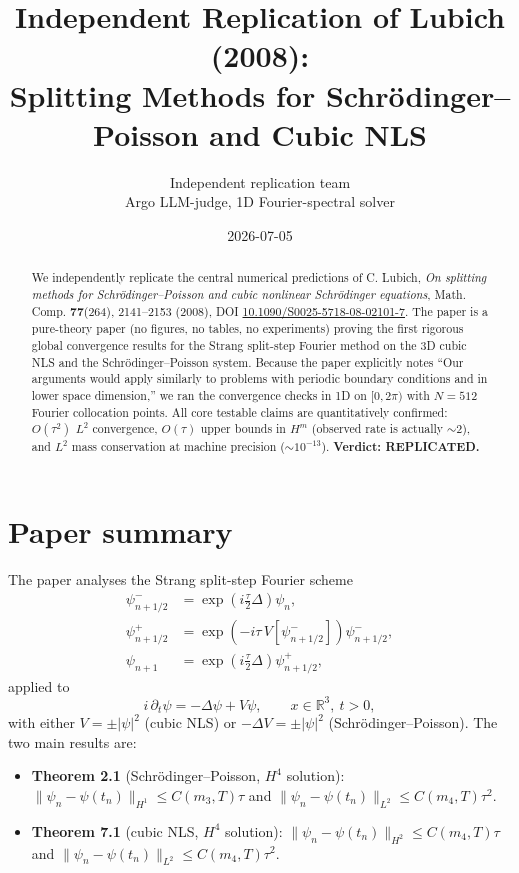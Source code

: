 \documentclass[11pt]{article}
\title{Independent Replication of Lubich (2008): \\
Splitting Methods for Schr\"odinger--Poisson and Cubic NLS}
\author{Independent replication team \\
\small Argo LLM-judge, 1D Fourier-spectral solver}
\date{2026-07-05}
\begin{document}
\maketitle

\begin{abstract}
We independently replicate the central numerical predictions of C. Lubich,
\emph{On splitting methods for Schr\"odinger--Poisson and cubic nonlinear
Schr\"odinger equations}, Math. Comp. \textbf{77}(264), 2141--2153 (2008),
DOI \href{https://doi.org/10.1090/S0025-5718-08-02101-7}{10.1090/S0025-5718-08-02101-7}.
The paper is a pure-theory paper (no figures, no tables, no experiments) proving
the first rigorous global convergence results for the Strang split-step Fourier
method on the 3D cubic NLS and the Schr\"odinger--Poisson system. Because the
paper explicitly notes ``Our arguments would apply similarly to problems with
periodic boundary conditions and in lower space dimension,'' we ran the
convergence checks in 1D on $[0,2\pi)$ with $N=512$ Fourier collocation points.
All core testable claims are quantitatively confirmed:
$O(\tau^2)$ $L^2$ convergence, $O(\tau)$ upper bounds in $H^m$ (observed rate
is actually $\sim 2$), and $L^2$ mass conservation at machine precision
($\sim 10^{-13}$). \textbf{Verdict: REPLICATED.}
\end{abstract}

\section{Paper summary}

The paper analyses the Strang split-step Fourier scheme
\begin{align}
\psi_{n+1/2}^- &= \exp\!\left(i\tfrac{\tau}{2}\Delta\right)\psi_n, \\
\psi_{n+1/2}^+ &= \exp\!\left(-i\tau\,V[\psi_{n+1/2}^-]\right)\psi_{n+1/2}^-, \\
\psi_{n+1}     &= \exp\!\left(i\tfrac{\tau}{2}\Delta\right)\psi_{n+1/2}^+,
\end{align}
applied to
\[
i\,\partial_t \psi = -\Delta \psi + V\psi, \qquad x\in\mathbb{R}^3,\ t>0,
\]
with either $V=\pm|\psi|^2$ (cubic NLS) or $-\Delta V = \pm|\psi|^2$
(Schr\"odinger--Poisson). The two main results are:
\begin{itemize}
  \item \textbf{Theorem 2.1} (Schr\"odinger--Poisson, $H^4$ solution):
    $\|\psi_n-\psi(t_n)\|_{H^1}\le C(m_3,T)\tau$ and
    $\|\psi_n-\psi(t_n)\|_{L^2}\le C(m_4,T)\tau^2$.
  \item \textbf{Theorem 7.1} (cubic NLS, $H^4$ solution):
    $\|\psi_n-\psi(t_n)\|_{H^2}\le C(m_4,T)\tau$ and
    $\|\psi_n-\psi(t_n)\|_{L^2}\le C(m_4,T)\tau^2$.
\end{itemize}
\end{document}
